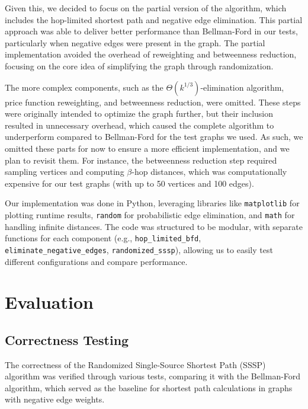\documentclass[12pt]{article}
\begin{document}
Given this, we decided to focus on the partial version of the algorithm, which includes the hop-limited shortest path and negative edge elimination. This partial approach was able to deliver better performance than Bellman-Ford in our tests, particularly when negative edges were present in the graph. The partial implementation avoided the overhead of reweighting and betweenness reduction, focusing on the core idea of simplifying the graph through randomization.

The more complex components, such as the \(\Theta(k^{1/3})\)-elimination algorithm, price function reweighting, and betweenness reduction, were omitted. These steps were originally intended to optimize the graph further, but their inclusion resulted in unnecessary overhead, which caused the complete algorithm to underperform compared to Bellman-Ford for the test graphs we used. As such, we omitted these parts for now to ensure a more efficient implementation, and we plan to revisit them. For instance, the betweenness reduction step required sampling vertices and computing \(\beta\)-hop distances, which was computationally expensive for our test graphs (with up to 50 vertices and 100 edges).

Our implementation was done in Python, leveraging libraries like \texttt{matplotlib} for plotting runtime results, \texttt{random} for probabilistic edge elimination, and \texttt{math} for handling infinite distances. The code was structured to be modular, with separate functions for each component (e.g., \texttt{hop\_limited\_bfd}, \texttt{eliminate\_negative\_edges}, \texttt{randomized\_sssp}), allowing us to easily test different configurations and compare performance.

\section{Evaluation}

\subsection{Correctness Testing}
The correctness of the Randomized Single-Source Shortest Path (SSSP) algorithm was verified through various tests, comparing it with the Bellman-Ford algorithm, which served as the baseline for shortest path calculations in graphs with negative edge weights.
\end{document}
